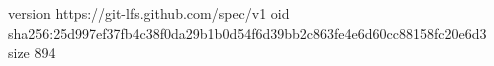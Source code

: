 version https://git-lfs.github.com/spec/v1
oid sha256:25d997ef37fb4c38f0da29b1b0d54f6d39bb2c863fe4e6d60cc88158fc20e6d3
size 894
